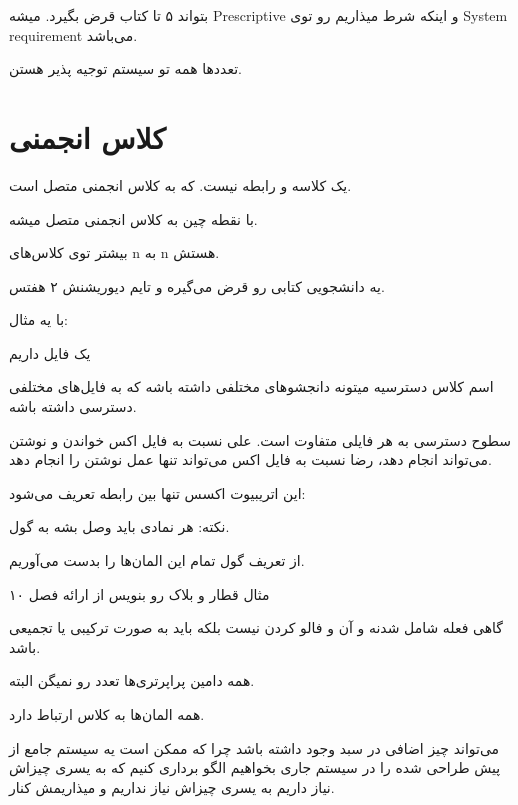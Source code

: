 بتواند ۵ تا کتاب قرض بگیرد. میشه Prescriptive و اینکه شرط میذاریم رو توی System
requirement می‌باشد.

تعدد‌ها همه تو سیستم توجیه پذیر هستن.

\section{کلاس انجمنی}

یک کلاسه و رابطه نیست. که به کلاس انجمنی متصل است.

با نقطه چین به کلاس انجمنی متصل میشه.

بیشتر توی کلاس‌های n به n هستش.

یه دانشجویی کتابی رو قرض می‌گیره و تایم دیوریشنش ۲ هفتس.

با یه مثال:

یک فایل داریم

اسم کلاس دسترسیه
میتونه دانجشو‌های مختلفی داشته باشه که به فایل‌های مختلفی دسترسی داشته باشه.

سطوح دسترسی به هر فایلی متفاوت است. علی نسبت به فایل اکس خواندن و نوشتن می‌تواند
انجام دهد، رضا نسبت به فایل اکس می‌تواند تنها عمل نوشتن را انجام دهد.

این اتریبیوت اکسس تنها بین رابطه تعریف می‌شود:




نکته: هر نمادی باید وصل بشه به گول.

از تعریف گول تمام این المان‌ها را بدست می‌آوریم.

مثال قطار و بلاک رو بنویس از ارائه فصل ۱۰

گاهی فعله شامل شدنه و آن و فالو کردن نیست بلکه باید به صورت ترکیبی یا تجمیعی
باشد.

همه دامین پراپرتری‌ها تعدد رو نمیگن البته.

همه المان‌ها به کلاس ارتباط دارد.

می‌تواند چیز اضافی در سبد وجود داشته باشد چرا که ممکن است یه سیستم جامع از پیش
طراحی شده را در سیستم جاری بخواهیم الگو برداری کنیم که به یسری چیزاش نیاز داریم
به یسری چیزاش نیاز نداریم و میذاریمش کنار.